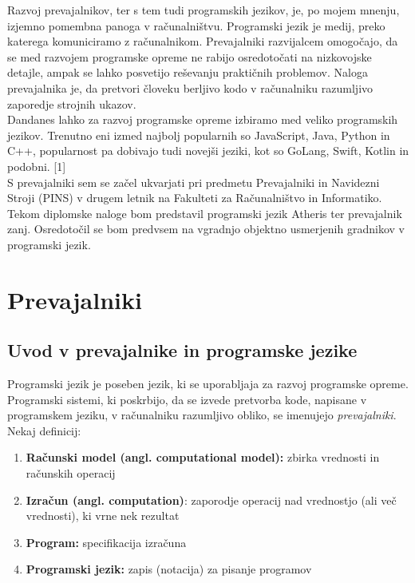 \documentclass[a4paper, 12pt]{book}
\begin{document}
Razvoj prevajalnikov, ter s tem tudi programskih jezikov, je, po mojem mnenju, izjemno pomembna panoga v računalništvu. Programski jezik je medij, preko katerega komuniciramo z računalnikom. Prevajalniki razvijalcem omogočajo, da se med razvojem programske opreme ne rabijo osredotočati na nizkovojske detajle, ampak se lahko posvetijo reševanju praktičnih problemov. Naloga prevajalnika je, da pretvori človeku berljivo kodo v računalniku razumljivo zaporedje strojnih ukazov. \\
\indent Dandanes lahko za razvoj programske opreme izbiramo med veliko programskih jezikov. Trenutno eni izmed najbolj popularnih so JavaScript, Java, Python in C++, popularnost pa dobivajo tudi novejši jeziki, kot so GoLang, Swift, Kotlin in podobni. [1] \\
\indent S prevajalniki sem se začel ukvarjati pri predmetu Prevajalniki in Navidezni Stroji (PINS) v drugem letnik na Fakulteti za Računalništvo in Informatiko. Tekom diplomske naloge bom predstavil programski jezik Atheris ter prevajalnik zanj. Osredotočil se bom predvsem na vgradnjo objektno usmerjenih gradnikov v programski jezik.

\chapter{Prevajalniki}
\label{ch0}

\section{Uvod v prevajalnike in programske jezike}

Programski jezik je poseben jezik, ki se uporabljaja za razvoj programske opreme. Programski sistemi, ki poskrbijo, da se izvede pretvorba kode, napisane v programskem jeziku, v računalniku razumljivo obliko, se imenujejo \textit{prevajalniki}. \\
Nekaj definicij:
\begin{enumerate}  
	\item \textbf{Računski model (angl. computational model):} zbirka vrednosti in računskih operacij 
	\item \textbf{Izračun (angl. computation)}: zaporodje operacij nad vrednostjo (ali več vrednosti), ki vrne nek rezultat
	\item \textbf{Program:} specifikacija izračuna
	\item \textbf{Programski jezik:} zapis (notacija) za pisanje programov
\end{enumerate}
\cite{computationalModel}
\end{document}
